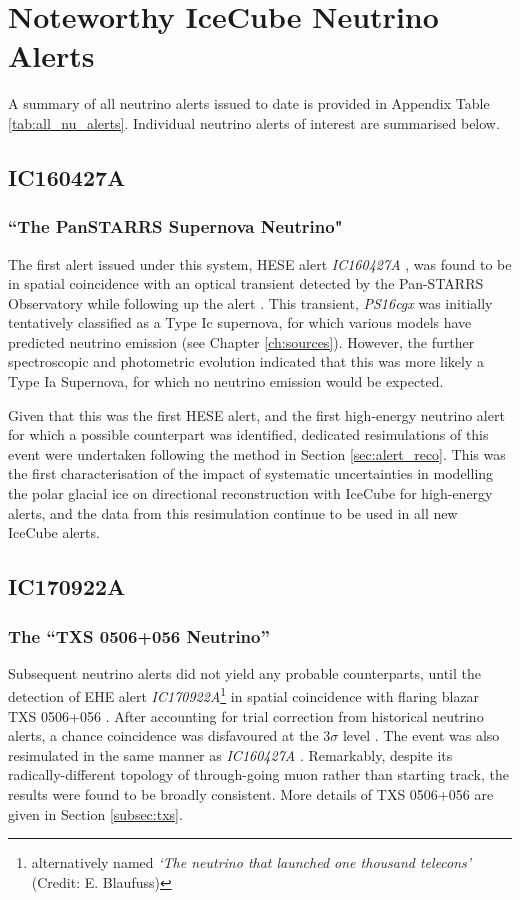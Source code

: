 \section{Noteworthy IceCube Neutrino Alerts}
\label{sec:nu_alerts}

A summary of all neutrino alerts issued to date is provided in Appendix Table \ref{tab:all_nu_alerts}. Individual neutrino alerts of interest are summarised below. 

\subsection{IC160427A}
\subsubsection*{``The PanSTARRS Supernova Neutrino"}

The first alert issued under this system, HESE alert \emph{IC160427A}  , was found to be in spatial coincidence with an optical transient detected by the Pan-STARRS Observatory while following up the alert \cite{ic_panstarrs_19}. This transient, \emph{PS16cgx} was initially tentatively classified as a Type Ic supernova, for which various models have predicted neutrino emission (see Chapter \ref{ch:sources}).  However, the further spectroscopic and photometric evolution indicated that this was  more likely a Type Ia Supernova, for which no neutrino emission would be expected. 

Given that this was the first HESE alert, and the first high-energy neutrino alert for which a possible counterpart was identified, dedicated resimulations of this event were undertaken following the method in Section \ref{sec:alert_reco}. This was the first characterisation of the impact of systematic uncertainties in modelling the polar glacial ice on directional reconstruction with IceCube for high-energy alerts, and the data from this resimulation continue to be used in all new IceCube alerts. 

\subsection{IC170922A}
\subsubsection*{The ``TXS 0506+056 Neutrino''}
Subsequent neutrino alerts did not yield any probable counterparts, until the detection of EHE alert \emph{IC170922A}\footnote{alternatively named \emph{`The neutrino that launched one thousand telecons'} (Credit: E. Blaufuss)}  in spatial coincidence with flaring blazar TXS 0506+056 . After accounting for trial correction from historical neutrino alerts, a chance coincidence was disfavoured at the 3$\sigma$ level . The event was also resimulated in the same manner as \emph{IC160427A} . Remarkably, despite its radically-different topology of through-going muon rather than starting track, the results were found to be broadly consistent. More details of TXS 0506+056 are given in Section \ref{subsec:txs}.

